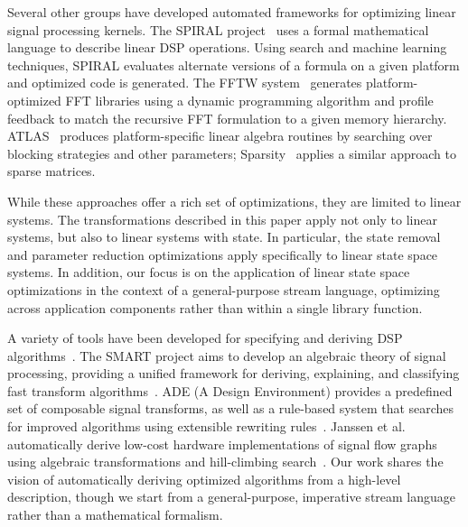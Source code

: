 Several other groups have developed automated frameworks for
optimizing linear signal processing kernels.  The SPIRAL
project~\cite{Spiral-SI} uses a formal mathematical language to
describe linear DSP operations.  Using search and machine learning
techniques, SPIRAL evaluates alternate versions of a formula on a
given platform and optimized code is generated.  The FFTW
system~\cite{FFTW-SI} generates platform-optimized FFT libraries using
a dynamic programming algorithm and profile feedback to match the
recursive FFT formulation to a given memory hierarchy.
ATLAS~\cite{ATLAS,ATLAS-Sparsity-SI} produces platform-specific linear
algebra routines by searching over blocking strategies and other
parameters; Sparsity~\cite{ATLAS-Sparsity-SI,Sparsity} applies a
similar approach to sparse matrices.

While these approaches offer a rich set of optimizations, they are
limited to linear systems.  The transformations described in this
paper apply not only to linear systems, but also to linear systems
with state.  In particular, the state removal and parameter reduction
optimizations apply specifically to linear state space systems.  In
addition, our focus is on the application of linear state space
optimizations in the context of a general-purpose stream language,
optimizing across application components rather than within a single
library function.

A variety of tools have been developed for specifying and deriving DSP
algorithms~\cite{oppenheim-symbolic}.  The SMART project aims to
develop an algebraic theory of signal processing, providing a unified
framework for deriving, explaining, and classifying fast transform
algorithms~\cite{SMART03}.  ADE (A Design Environment) provides a
predefined set of composable signal transforms, as well as a
rule-based system that searches for improved algorithms using
extensible rewriting rules~\cite{covell-ade}.  Janssen et al.
automatically derive low-cost hardware implementations of signal flow
graphs using algebraic transformations and hill-climbing
search~\cite{Janssen94}.  Our work shares the vision of automatically
deriving optimized algorithms from a high-level description, though we
start from a general-purpose, imperative stream language rather than a
mathematical formalism.


